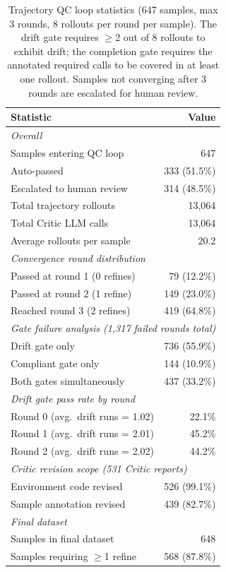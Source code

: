 \begin{table}[h]
\centering
\small
\caption{Trajectory QC loop statistics (647 samples, max 3 rounds, 8 rollouts per round per sample).
  The drift gate requires $\geq$2 out of 8 rollouts to exhibit drift;
  the completion gate requires the annotated required calls to be covered in at least one rollout.
  Samples not converging after 3 rounds are escalated for human review.}
\label{tab:trajectory-qc}
\begin{tabular}{p{9cm}r}
\toprule
\textbf{Statistic} & \textbf{Value} \\
\midrule
\multicolumn{2}{l}{\textit{Overall}} \\
\quad Samples entering QC loop         & 647 \\
\quad Auto-passed                      & 333 \quad (51.5\%) \\
\quad Escalated to human review        & 314 \quad (48.5\%) \\
\quad Total trajectory rollouts        & 13{,}064 \\
\quad Total Critic LLM calls           & 13{,}064 \\
\quad Average rollouts per sample      & 20.2 \\
\midrule
\multicolumn{2}{l}{\textit{Convergence round distribution}} \\
\quad Passed at round 1 (0 refines)    & 79 \quad (12.2\%) \\
\quad Passed at round 2 (1 refine)     & 149 \quad (23.0\%) \\
\quad Reached round 3 (2 refines)      & 419 \quad (64.8\%) \\
\midrule
\multicolumn{2}{l}{\textit{Gate failure analysis (1,317 failed rounds total)}} \\
\quad Drift gate only                  & 736 \quad (55.9\%) \\
\quad Compliant gate only              & 144 \quad (10.9\%) \\
\quad Both gates simultaneously        & 437 \quad (33.2\%) \\
\midrule
\multicolumn{2}{l}{\textit{Drift gate pass rate by round}} \\
\quad Round 0 (avg.\ drift runs = 1.02) & 22.1\% \\
\quad Round 1 (avg.\ drift runs = 2.01) & 45.2\% \\
\quad Round 2 (avg.\ drift runs = 2.02) & 44.2\% \\
\midrule
\multicolumn{2}{l}{\textit{Critic revision scope (531 Critic reports)}} \\
\quad Environment code revised         & 526 \quad (99.1\%) \\
\quad Sample annotation revised        & 439 \quad (82.7\%) \\
\midrule
\multicolumn{2}{l}{\textit{Final dataset}} \\
\quad Samples in final dataset         & 648 \\
\quad Samples requiring $\geq$1 refine & 568 \quad (87.8\%) \\
\bottomrule
\end{tabular}
\end{table}

